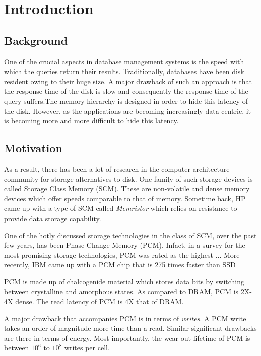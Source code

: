 \chapter{Introduction}
\label{intro}

\section{Background}
One of the crucial aspects in database management systems is the speed with which the queries return their results. Traditionally, databases have been disk resident owing to their huge size. A major drawback of such an approach is that the response time of the disk is slow and consequently the response time of the query suffers.The memory hierarchy is designed in order to hide this latency of the disk. However, as the applications are becoming increasingly data-centric, it is becoming more and more difficult to hide this latency\cite{overview}.

\section{Motivation}
As a result, there has been a lot of research in the computer architecture community for storage alternatives to disk. One family of such storage devices is called Storage Class Memory (SCM). These are non-volatile and dense memory devices which offer speeds comparable to that of memory. Sometime back, HP came up with a type of SCM called \textit{Memristor}\cite{overview}  which relies on resistance to provide data storage capability. 

One of the hotly discussed storage technologies in the class of SCM, over the past few years, has been Phase Change Memory (PCM)\cite{viglas,qureshi,chen}. Infact, in a survey for the most promising storage technologies, PCM was rated as the highest ... More recently, IBM came up with a PCM chip that is 275 times faster than SSD \cite{ibm}

PCM is made up of chalcogenide material which stores data bits by switching between crystalline and amorphous states. As compared to DRAM, PCM is 2X-4X dense. The read latency of PCM is 4X that of DRAM. 

A major drawback that accompanies PCM is in terms of \textit{writes}. A PCM write takes an order of magnitude more time than a read\cite{qureshi}. Similar significant drawbacks are there in terms of energy. Most importantly, the wear out lifetime of PCM is between $10^6$ to $10^8$ writes per cell.

